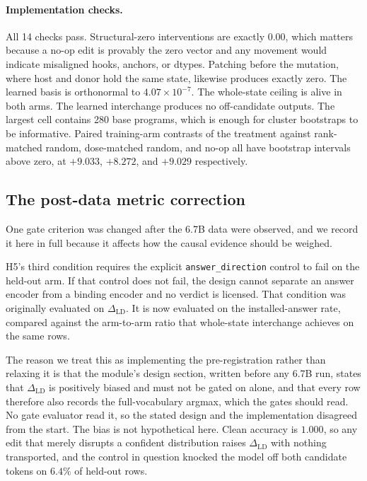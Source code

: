 \documentclass{article}
\begin{document}
\paragraph{Implementation checks.}
All 14 checks pass. Structural-zero interventions are exactly $0.00$, which matters because a no-op edit is provably the zero vector and any movement would indicate misaligned hooks, anchors, or dtypes. Patching before the mutation, where host and donor hold the same state, likewise produces exactly zero. The learned basis is orthonormal to $4.07\times10^{-7}$. The whole-state ceiling is alive in both arms. The learned interchange produces no off-candidate outputs. The largest cell contains 280 base programs, which is enough for cluster bootstraps to be informative. Paired training-arm contrasts of the treatment against rank-matched random, dose-matched random, and no-op all have bootstrap intervals above zero, at $+9.033$, $+8.272$, and $+9.029$ respectively.

\subsection{The post-data metric correction}
\label{app:h5}

One gate criterion was changed after the 6.7B data were observed, and we record it here in full because it affects how the causal evidence should be weighed.

H5's third condition requires the explicit \texttt{answer\_direction} control to fail on the held-out arm. If that control does not fail, the design cannot separate an answer encoder from a binding encoder and no verdict is licensed. That condition was originally evaluated on $\Delta_{\mathrm{LD}}$. It is now evaluated on the installed-answer rate, compared against the arm-to-arm ratio that whole-state interchange achieves on the same rows.

The reason we treat this as implementing the pre-registration rather than relaxing it is that the module's design section, written before any 6.7B run, states that $\Delta_{\mathrm{LD}}$ is positively biased and must not be gated on alone, and that every row therefore also records the full-vocabulary argmax, which the gates should read. No gate evaluator read it, so the stated design and the implementation disagreed from the start. The bias is not hypothetical here. Clean accuracy is $1.000$, so any edit that merely disrupts a confident distribution raises $\Delta_{\mathrm{LD}}$ with nothing transported, and the control in question knocked the model off both candidate tokens on $6.4\%$ of held-out rows.
\end{document}
